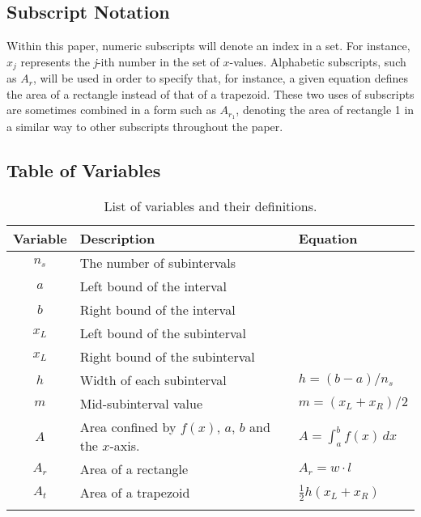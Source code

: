\documentclass{paper}
\begin{document}
\subsection{Subscript Notation}
Within this paper, numeric subscripts will denote an index in a set.
For instance, \(x_j\) represents the \emph{j}-ith number in the set of \(x\)-values.
Alphabetic subscripts, such as \(A_r\), will be used in order to specify that, for instance, a given equation defines the area of a rectangle instead of that of a trapezoid.
These two uses of subscripts are sometimes combined in a form such as \(A_{r_1}\), denoting the area of rectangle 1 in a similar way to other subscripts throughout the paper.
%
\subsection{Table of Variables}
\renewcommand{\arraystretch}{1.1}
\begin{table}[ht]
    \centering
    \begin{tabular}{cll}
            \dtoprule
            \textbf{Variable}   &   \textbf{Description}            &   \textbf{Equation}       \\
            \hline
            \(n_s\)             &   The number of subintervals      &                           \\
            \(a\)               &   Left bound of the interval      &                           \\
            \(b\)               &   Right bound of the interval     &                           \\
            \(x_L\)             &   Left bound of the subinterval   &                           \\
            \(x_L\)             &   Right bound of the subinterval  &                           \\
            \(h\)               &   Width of each subinterval       &   \(h=(b-a)/n_s\)         \\
            \(m\)               &   Mid-subinterval value           &   \(m=(x_L+x_R)/2\)       \\
            \(A\)               &   Area confined by \(f(x)\), \(a\), \(b\) and the \(x\)-axis. & \(A=\int_a^b f(x) \, dx\) \\
            \(A_r\)             &   Area of a rectangle             &   \(A_r=w \cdot l\)       \\
            \(A_t\)             &   Area of a trapezoid             &   \(\frac{1}{2} h (x_L + x_R)\)  \\
            \dbottomrule
    \end{tabular}
    \caption{List of variables and their definitions.}
    \label{table:variables}
\end{table}
%
\end{document}
